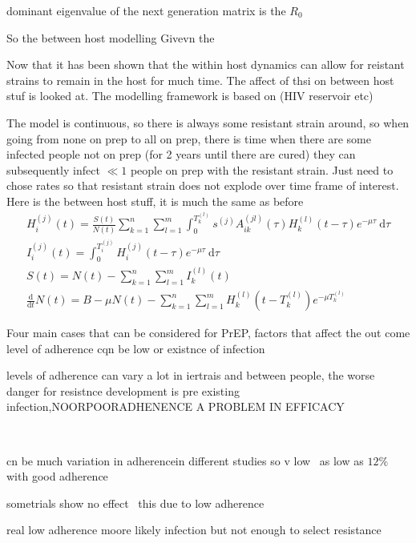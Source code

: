 \documentclass[DIV=15]{scrartcl}
\begin{document}
dominant eigenvalue of the next generation matrix is the $R_0$ \cite{diekmann2013}


So the between host modelling Givevn the


Now that it has been shown that the within host dynamics can allow  for reistant strains to remain in the  host for much time. The affect of thsi on between host stuf  is looked at. The modelling framework is based on (HIV reservoir etc)


The model is continuous, so there is always some resistant strain around, so when going from none on prep  to all on prep, there is time when there are some infected people not on prep (for 2 years until there are cured) they can subsequently infect $\ll 1$   people on prep with the resistant strain. Just need to chose rates so that resistant strain does not explode over time frame of interest.  Here is the between host stuff, it is much the same as before
\begin{gather*}
H^{(j)}_{i}(t) = \frac{S(t)}{N(t)}  \sum_{k=1}^n \sum_{l=1}^m  \int_0^{T^{(l)}_{k}} s^{(j)} A^{(jl)}_{ik}(\tau) H^{(l)}_{k}(t-\tau)e^{-\mu \tau} \ \text{d}\tau \\
I_i^{(j)}(t) = \int_0^{T_i^{(j)}}  H_i^{(j)}(t-\tau)e^{-\mu \tau} \  \text{d}\tau \\
S(t) = N(t) -  \sum_{k=1}^n \sum_{l=1}^m  I^{(l)}_k(t) \\
\frac{\text{d}}{\text{d} t}  N(t) = B- \mu N(t) -\sum_{k=1}^n \sum_{l=1}^m  H_k^{(l)}(t-T_k^{(l)})e^{-\mu T_k^{(l)}} 
\end{gather*}

 








 Four main cases that can be considered for PrEP, factors that affect the out come level of adherence     cqn be low or existnce of infection
 
 levels of adherence can vary a  lot in iertrais and between people, the worse danger for resistnce development is pre existing infection,NOORPOORADHENENCE A PROBLEM IN EFFICACY
 
 ~\cite{vanderstraten2012}
 
 cn be much variation in adherencein different studies so v low~\cite{corneli2014} as low as $12\%$ with good adherence
 
 
 sometrials show no effect~\cite{vandamme2012} this due to low adherence
 
 real low adherence moore likely infection but not enough to select resistance
  
\end{document}
